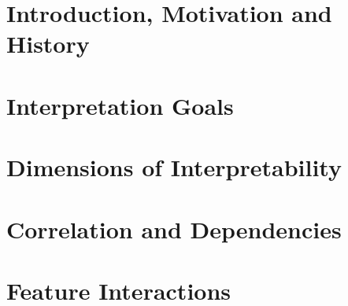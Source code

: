 \documentclass[11pt,compress,t,notes=noshow, aspectratio=169, xcolor=table]{beamer}
\newcommand{\pathiml}{../}
\begin{document}


%
\section{Introduction, Motivation and History}


\section{Interpretation Goals}


\section{Dimensions of Interpretability}


\section{Correlation and Dependencies}


\section{Feature Interactions}


% 
%
% 
\end{document}
